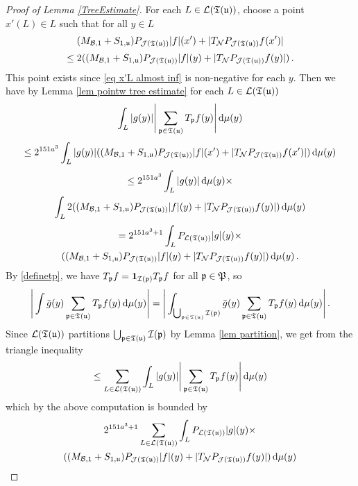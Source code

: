 {\begin{proof}[Proof of Lemma \ref{TreeEstimate}]
    For each $L \in \mathcal{L}(\mathfrak T(\mathfrak u))$, choose a point $x'(L) \in L$ such that for all $y \in L$
    $$
        (M_{\mathcal{B},1}+S_{1,\mathfrak u})P_{\mathcal{J}(\mathfrak T(\mathfrak u))}|f|(x')+|T_{\mathcal{N}}P_{\mathcal{J}(\mathfrak T(\mathfrak u))}f(x')|
    $$
    \begin{equation}
        \label{eq x'L almost inf}
        \le 2 ((M_{\mathcal{B},1}+S_{1,\mathfrak u})P_{\mathcal{J}(\mathfrak T(\mathfrak u))}|f|(y)+|T_{\mathcal{N}}P_{\mathcal{J}(\mathfrak T(\mathfrak u))}f(y)|)\,.
    \end{equation}
    This point exists since \eqref{eq x'L almost inf} is non-negative for each $y$.
    Then we have by Lemma \ref{lem pointw tree estimate} for each $L \in \mathcal{L}(\mathfrak T(\mathfrak u))$
    $$
        \int_L |g(y)| \Bigg| \sum_{\mathfrak p \in \mathfrak T(\mathfrak u)} T_{\mathfrak p} f(y) \Bigg| \, \mathrm{d}\mu(y)
    $$
    $$
        \le 2^{151a^3} \int_L |g(y)| ((M_{\mathcal{B},1}+S_{1,\mathfrak u})P_{\mathcal{J}(\mathfrak T(\mathfrak u))}|f|(x')+|T_{\mathcal{N}}P_{\mathcal{J}(\mathfrak T(\mathfrak u))}f(x')| ) \, \mathrm{d}\mu(y)
    $$
    \begin{multline*}
        \le 2^{151a^3} \int_L |g(y)| \, \mathrm{d}\mu(y)\times\\
         \int_L 2((M_{\mathcal{B},1}+S_{1,\mathfrak u})P_{\mathcal{J}(\mathfrak T(\mathfrak u))}|f|(y)+|T_{\mathcal{N}}P_{\mathcal{J}(\mathfrak T(\mathfrak u))}f(y)| ) \, \mathrm{d}\mu(y)
    \end{multline*}
    \begin{multline*}
        =  2^{151a^3 + 1} \int_L P_{\mathcal{L}(\mathfrak T(\mathfrak u))}|g|(y)\times \\((M_{\mathcal{B},1}+S_{1,\mathfrak u})P_{\mathcal{J}(\mathfrak T(\mathfrak u))}|f|(y)+|T_{\mathcal{N}}P_{\mathcal{J}(\mathfrak T(\mathfrak u))}f(y)| ) \, \mathrm{d}\mu(y)\,.
    \end{multline*}
    By \eqref{definetp}, we have $T_{\mathfrak p} f = \mathbf{1}_{\mathcal{I}(\mathfrak p)} T_{\mathfrak p} f$ for all $\mathfrak p \in \mathfrak P$, so
    $$
        \Bigg| \int \bar g(y) \sum_{\mathfrak p \in \mathfrak T(\mathfrak u)} T_{\mathfrak p} f(y)  \, \mathrm{d}\mu(y) \Bigg| = \Bigg| \int_{\bigcup_{\mathfrak p \in \mathfrak T(\mathfrak u)} \mathcal{I}(\mathfrak p)} \bar g(y) \sum_{\mathfrak p \in \mathfrak T(\mathfrak u)} T_{\mathfrak p} f(y)  \, \mathrm{d}\mu(y) \Bigg|\,.
    $$
    Since $\mathcal{L}(\mathfrak T(\mathfrak u))$ partitions $\bigcup_{\mathfrak p \in \mathfrak T(\mathfrak u)} \mathcal{I}(\mathfrak p)$ by Lemma \ref{lem partition},
    we get from the triangle inequality
    $$
        \le \sum_{L \in \mathcal{L}(\mathfrak T(\mathfrak u))} \int_L |g(y)| \Bigg| \sum_{\mathfrak p \in \mathfrak T(\mathfrak u)} T_{\mathfrak p} f(y) \Bigg| \, \mathrm{d}\mu(y)
    $$
    which by the above computation is bounded by
    \begin{multline*}
        2^{151a^3 + 1} \sum_{L \in \mathcal{L}(\fT(\fu))} \int_L P_{\mathcal{L}(\fT(\fu))}|g|(y) \times \\((M_{\mathcal{B},1}+S_{1,\fu})P_{\mathcal{J}(\fT(\fu))}|f|(y)+|T_{\mathcal{N}}P_{\mathcal{J}(\fT(\fu))}f(y)| ) \, \mathrm{d}\mu(y)

\end{multline*}
\end{proof}}
